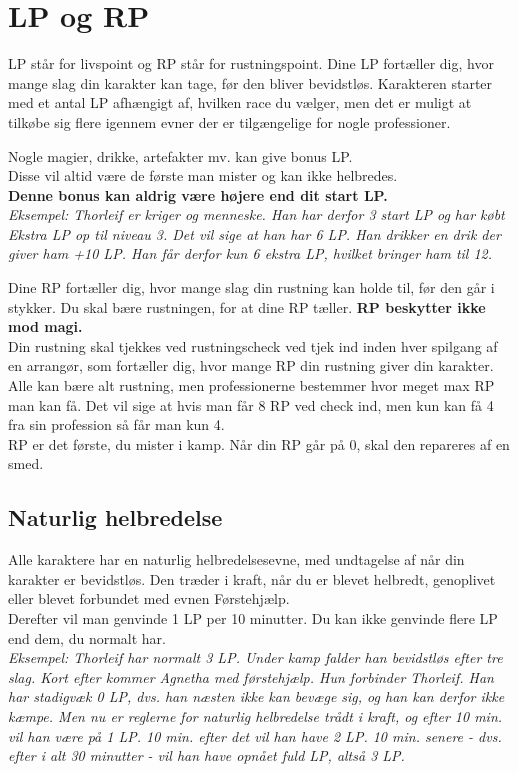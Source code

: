 \section{LP og RP}
LP står for livspoint og RP står for rustningspoint. Dine LP fortæller dig, hvor mange slag din karakter kan tage, før den bliver bevidstløs. Karakteren starter med et antal LP afhængigt af, hvilken race du vælger, men det er muligt at tilkøbe sig flere igennem evner der er tilgængelige for nogle professioner.\\
\begin{tcolorbox}[colback=red!10!white, colframe=red!80!black, title=Ultra Vigtig Information]
Nogle magier, drikke, artefakter mv. kan give bonus LP.\\
Disse vil altid være de første man mister og kan ikke helbredes.\\
\textbf{Denne bonus kan aldrig være højere end dit start LP.} \\
\textit{Eksempel: Thorleif er kriger og menneske. Han har derfor 3 start LP og har købt Ekstra LP op til niveau 3. Det vil sige at han har 6 LP. Han drikker en drik der giver ham +10 LP. Han får derfor kun 6 ekstra LP, hvilket bringer ham til 12.}
\end{tcolorbox}
Dine RP fortæller dig, hvor mange slag din rustning kan holde til, før den går i stykker. Du skal bære rustningen, for at dine RP tæller. \textbf{RP beskytter ikke mod magi.}\\
Din rustning skal tjekkes ved rustningscheck ved tjek ind inden hver spilgang af en arrangør, som fortæller dig, hvor mange RP din rustning giver din karakter. Alle kan bære alt rustning, men professionerne bestemmer hvor meget max RP man kan få. Det vil sige at hvis man får 8 RP ved check ind, men kun kan få 4 fra sin profession så får man kun 4.\\  
RP er det første, du mister i kamp. Når din RP går på 0, skal den repareres af en smed.

\subsection{Naturlig helbredelse}
Alle karaktere har en naturlig helbredelsesevne, med undtagelse af når din karakter er bevidstløs. Den træder i kraft, når du er blevet helbredt, genoplivet eller blevet forbundet med evnen Førstehjælp.\\
Derefter vil man genvinde 1 LP per 10 minutter. Du kan ikke genvinde flere LP end dem, du normalt har.\\
\textit{Eksempel: Thorleif har normalt 3 LP. Under kamp falder han bevidstløs efter tre slag. Kort efter kommer Agnetha med førstehjælp. Hun forbinder Thorleif. Han har stadigvæk 0 LP, dvs. han næsten ikke kan bevæge sig, og han kan derfor ikke kæmpe. Men nu er reglerne for naturlig helbredelse trådt i kraft, og efter 10 min. vil han være på 1 LP. 10 min. efter det vil han have 2 LP. 10 min. senere - dvs. efter i alt 30 minutter - vil han have opnået fuld LP, altså 3 LP.}

